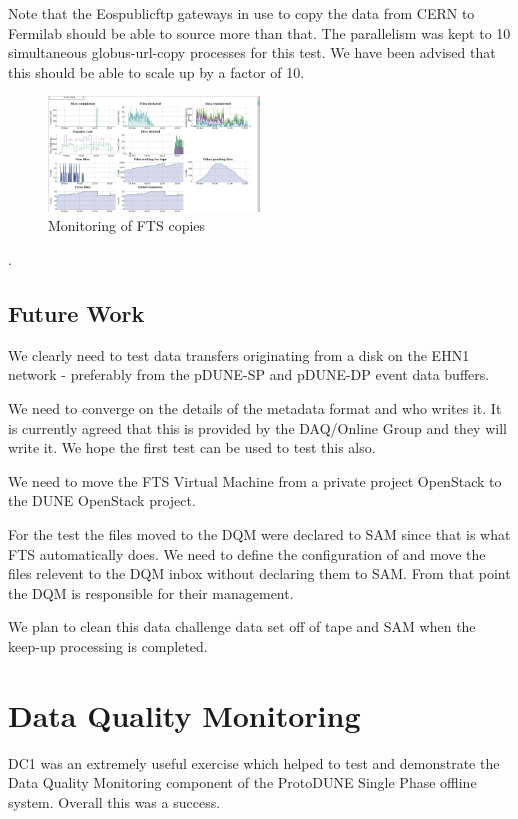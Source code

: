 \documentclass[pdftex,12pt,letter]{article}
\begin{document}
Note that the Eospublicftp gateways in use to copy the data from CERN to Fermilab should be able to source more than that. The parallelism was kept to 10 simultaneous globus-url-copy processes for this test. We have  been advised that this should be able to scale up by a factor of 10.

\begin{figure}[tbh]
  \centering
  \includegraphics[width=0.5\textwidth]{./ReportImages/FTS.jpg}
  \caption{Monitoring of FTS copies}
  \label{fig:FTStoFermilab}
  
\end{figure}. 



\subsection {Future Work}
We clearly need to test data transfers originating from a disk on the EHN1 network - preferably from the pDUNE-SP and pDUNE-DP event data buffers. 

We need to converge on  the details of the metadata format and who writes it. It is currently agreed that this is provided by the DAQ/Online Group and they will write it. We hope the first test can be used to test this also. 

We need to move the FTS Virtual Machine from a private project OpenStack to the  DUNE OpenStack project. 

For the test the files moved to the DQM were declared to SAM since that is what FTS automatically does. We need to define the configuration of and move the files relevent to the DQM inbox without declaring them to SAM. From that point the DQM is responsible for their management.

We plan to clean this data challenge data set off of tape and SAM when the keep-up processing is completed.


\section {Data Quality Monitoring}
DC1 was an extremely useful exercise which helped to test and demonstrate the Data Quality Monitoring component
of the ProtoDUNE Single Phase offline system. Overall this was a success.
\end{document}
